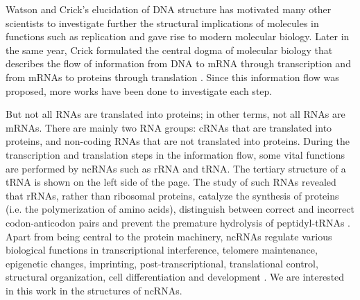 Watson and Crick's elucidation of \ac{DNA} structure has motivated many other scientists to investigate further the structural implications of molecules in functions such as replication and gave rise to modern molecular biology. Later in the same year, Crick formulated the central dogma of molecular biology that describes the flow of information from \ac{DNA} to \ac{mRNA} through transcription and from mRNAs to proteins through translation  \cite{crick1970central}. Since this information flow was proposed, more works have been done to investigate each step. 

But not all \acp{RNA} are translated into proteins; in other terms, not all \acp{RNA} are \acp{mRNA}. There are mainly two \ac{RNA} groups: \acp{cRNA} that are translated into proteins, and non-coding \acp{RNA} that are not translated into proteins. During the transcription and translation steps in the information flow, some vital functions are performed by \acp{ncRNA} such as \ac{rRNA} and \ac{tRNA}. The tertiary structure of a \ac{tRNA} is shown on the left side of the page.
The study of such \acp{RNA} revealed that \acp{rRNA}, rather than ribosomal proteins, catalyze the synthesis of proteins (i.e. the polymerization of amino acids), distinguish between correct and incorrect codon-anticodon pairs and prevent the premature hydrolysis of peptidyl-tRNAs \cite{moore2011roles, breaker2006rna}. Apart from being central to the protein machinery, \acp{ncRNA} regulate various biological functions in transcriptional interference, telomere maintenance, epigenetic changes, imprinting, post-transcriptional, translational control, structural organization, cell differentiation and development \cite{fatica2014long,santosh2015non}. We are interested in this work in the structures of \acp{ncRNA}.

